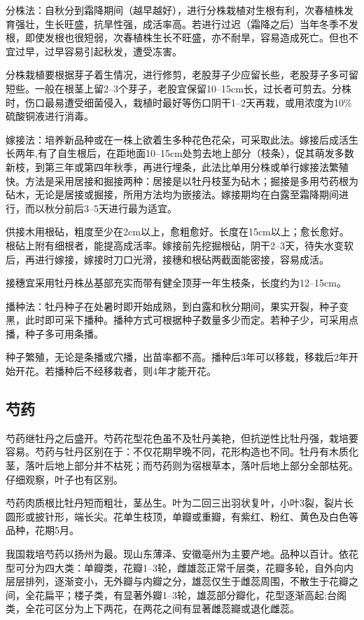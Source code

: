 \documentclass{ctexbook}
\begin{document}
分株法：自秋分到霜降期间（越早越好），进行分株栽植对生根有利，次春植株发育强壮，生长旺盛，抗旱性强，成活率高。若进行过迟（霜降之后）当年冬季不发根，即使发根也很短弱，次春植株生长不旺盛，亦不耐旱，容易造成死亡。但也不宜过早，过早容易引起秋发，遭受冻害。

分株栽植要根据芽子着生情况，进行修剪，老股芽子少应留长些，老股芽子多可留短些。一般在根茎上留2--3个芽子，老股宜保留10--15cm长，过长者可剪去。分株时，伤口最易遭受细菌侵入，栽植时最好等伤口阴干1--2天再栽，或用浓度为10\%硫酸铜液进行消毒。

嫁接法：培养新品种或在一株上欲着生多种花色花朵，可采取此法。嫁接后成活生长两年,有了自生根后，在距地面10--15cm处剪去地上部分（枝条），促其萌发多数新枝，到第三年或第四年秋季，再进行埋条，此法比单用分株或单行嫁接法繁殖快。方法是采用居接和掘接两种：居接是以牡丹枝茎为砧木；掘接是多用芍药根为砧木，无论是居接或掘接，所用方法均为嵌接法。嫁接期均在白露至霜降期间进行，而以秋分前后3--5天进行最为适宜。

供接木用根砧，粗度至少在2cm以上，愈粗愈好。长度在15cm以上；愈长愈好。根砧上附有细根者，能提高成活率。嫁接前先挖掘根砧，阴干2--3天，待失水变软后，再进行嫁接，嫁接时刀口光滑，接穗和根砧两截面能密接，容易成活。

接穗宜采用牡丹株丛基部充实而带有健全顶芽一年生枝条，长度约为12--15cm。

播种法：牡丹种子在处暑时即开始成熟，到白露和秋分期间，果实开裂，种子变黑，此时即可采下播种。播种方式可根据种子数量多少而定。若种子少，可采用点播，种子多可用条播。

种子繁殖，无论是条播或穴播，出苗率都不高。播种后3年可以移栽，移栽后2年开始开花。若播种后不经移栽者，则4年才能开花。
\subsection{芍药}
芍药继牡丹之后盛开。芍药花型花色虽不及牡丹美艳，但抗逆性比牡丹强，栽培要容易。芍药与牡丹区别在于：不仅花期早晚不同，花形构造也不同。牡丹有木质化茎，落叶后地上部分并不枯死；而芍药则为宿根草本，落叶后地上部分全部枯死。仔细观察，叶子也有区别。

芍药肉质根比牡丹短而粗壮，茎丛生。叶为二回三出羽状复叶，小叶3裂，裂片长圆形或披针形，端长尖。花单生枝顶，单瓣或重瓣，有紫红、粉红、黄色及白色等品种，花期5月。

我国栽培芍药以扬州为最。现山东薄泽、安徽亳州为主要产地。品种以百计。依花型可分为四大类：单瓣类，花瓣1--3轮，雌雄蕊正常千层类，花瓣多轮，自外向内层层排列，逐渐变小，无外瓣与内瓣之分，雄蕊仅生于雌蕊周围，不散生于花瓣之间，全花扁平；楼子类，有显著外瓣1--3轮，雄蕊部分瓣化，花型逐渐高起;台阁类，全花可区分为上下两花，在两花之间有显著雌蕊瓣或退化雌蕊。
\end{document}
